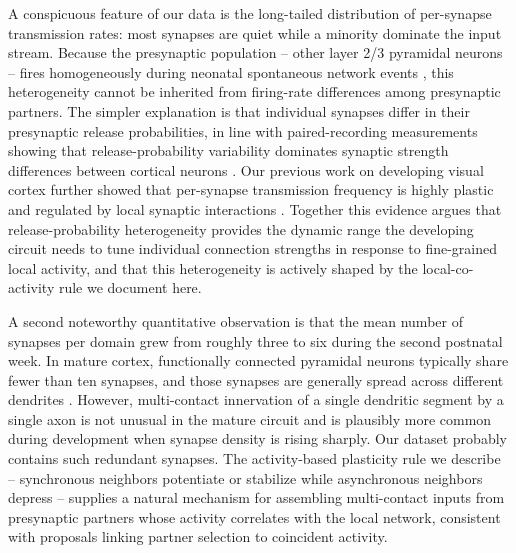 \documentclass[11pt]{article}
\begin{document}
A conspicuous feature of our data is the long-tailed distribution of per-synapse transmission rates: most synapses are quiet while a minority dominate the input stream. Because the presynaptic population -- other layer 2/3 pyramidal neurons -- fires homogeneously during neonatal spontaneous network events \citep{siegel2012peripheral,ackman2012retinal}, this heterogeneity cannot be inherited from firing-rate differences among presynaptic partners. The simpler explanation is that individual synapses differ in their presynaptic release probabilities, in line with paired-recording measurements showing that release-probability variability dominates synaptic strength differences between cortical neurons \citep{markram1997physiology,silver2003high}. Our previous work on developing visual cortex further showed that per-synapse transmission frequency is highly plastic and regulated by local synaptic interactions \citep{winnubst2012synaptic}. Together this evidence argues that release-probability heterogeneity provides the dynamic range the developing circuit needs to tune individual connection strengths in response to fine-grained local activity, and that this heterogeneity is actively shaped by the local-co-activity rule we document here.

A second noteworthy quantitative observation is that the mean number of synapses per domain grew from roughly three to six during the second postnatal week. In mature cortex, functionally connected pyramidal neurons typically share fewer than ten synapses, and those synapses are generally spread across different dendrites \citep{markram1997physiology,silver2003high}. However, multi-contact innervation of a single dendritic segment by a single axon is not unusual in the mature circuit and is plausibly more common during development when synapse density is rising sharply. Our dataset probably contains such redundant synapses. The activity-based plasticity rule we describe -- synchronous neighbors potentiate or stabilize while asynchronous neighbors depress -- supplies a natural mechanism for assembling multi-contact inputs from presynaptic partners whose activity correlates with the local network, consistent with proposals linking partner selection to coincident activity.
\end{document}

